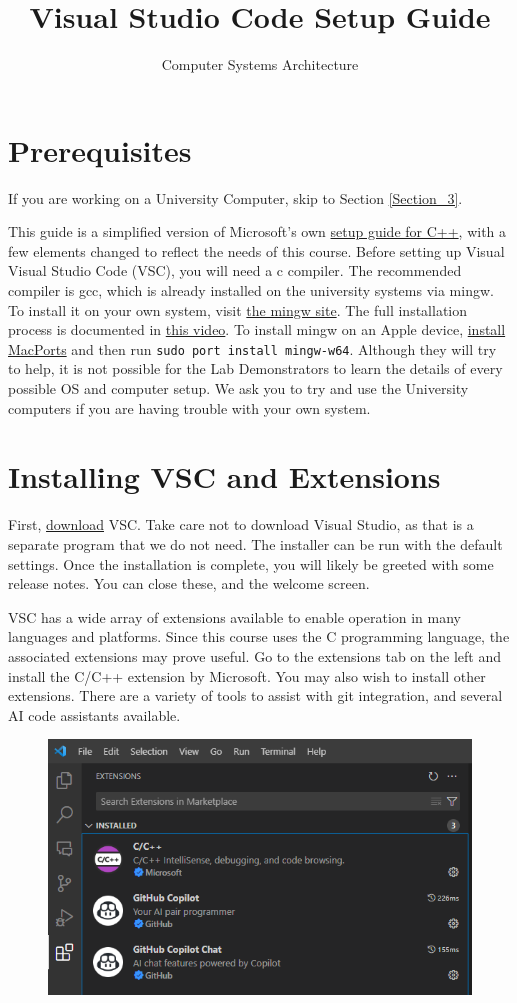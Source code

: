 \documentclass{article}
\title{Visual Studio Code Setup Guide}
\author{Computer Systems Architecture}
\begin{document}
\maketitle

\section{Prerequisites}

If you are working on a University Computer, skip to Section \ref{Section_3}.


This guide is a simplified version of Microsoft's own \href{https://code.visualstudio.com/docs/cpp/config-mingw}{setup guide for C++}, with a few elements changed to reflect the needs of this course. Before setting up Visual Visual Studio Code (VSC), you will need a c compiler. The recommended compiler is gcc, which is already installed on the university systems via mingw. To install it on your own system, visit \href{https://www.mingw-w64.org/}{the mingw site}. The full installation process is documented in \href{https://www.youtube.com/watch?v=oC69vlWofJQ}{this video}. To install mingw on an Apple device, \href{https://www.macports.org/install.php}{install MacPorts} and then run \verb|sudo port install mingw-w64|. Although they will try to help, it is not possible for the Lab Demonstrators to learn the details of every possible OS and computer setup. We ask you to try and use the University computers if you are having trouble with your own system. 

\section{Installing VSC and Extensions}
First, \href{https://code.visualstudio.com/download}{download} VSC. Take care not to download Visual Studio, as that is a separate program that we do not need. The installer can be run with the default settings. Once the installation is complete, you will likely be greeted with some release notes. You can close these, and the welcome screen. 

VSC has a wide array of extensions available to enable operation in many languages and platforms. Since this course uses the C programming language, the associated extensions may prove useful. Go to the extensions tab on the left and install the C/C++ extension by Microsoft. You may also wish to install other extensions. There are a variety of tools to assist with git integration, and several AI code assistants available.
\begin{figure}[h]
    \centering
    \includegraphics[width=0.5\linewidth]{extensions.png}
    \label{fig:enter-label}
\end{figure}
\end{document}
